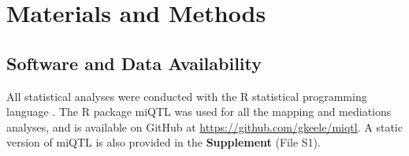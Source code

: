 \section{Materials and Methods}
\label{sec:materials:methods}





\subsection{Software and Data Availability}

All statistical analyses were conducted with the R statistical programming language \citep{RSoftware2019}. The R package miQTL was used for all the mapping and mediations analyses, and is available on GitHub at \url{https://github.com/gkeele/miqtl}. A static version of miQTL is also provided in the \textbf{Supplement} (File S1).